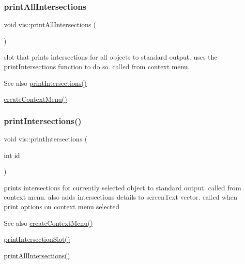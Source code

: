 \subsubsection{\texorpdfstring{print\+All\+Intersections}{printAllIntersections}}
{\footnotesize\ttfamily void vis\+::print\+All\+Intersections (\begin{DoxyParamCaption}{ }\end{DoxyParamCaption})\hspace{0.3cm}{\ttfamily [slot]}}

slot that prints intersections for all objects to standard output. uses the print\+Intersections function to do so. called from context menu.

\begin{DoxySeeAlso}{See also}
\mbox{\hyperlink{classvis_a9d087bde79e6856772dc3a1f6f89294e}{print\+Intersections()}} 

\mbox{\hyperlink{classvis_a63af66f730f0f06f36d255bcc7a7a244}{create\+Context\+Menu()}} 
\end{DoxySeeAlso}
\mbox{\label{classvis_a9d087bde79e6856772dc3a1f6f89294e}} 
\subsubsection{\texorpdfstring{print\+Intersections()}{printIntersections()}}
{\footnotesize\ttfamily void vis\+::print\+Intersections (\begin{DoxyParamCaption}\item[{int}]{id }\end{DoxyParamCaption})}

prints intersections for currently selected object to standard output. called from context menu. also adds intersections details to screen\+Text vector. called when print options on context menu selected ~\newline
 \begin{DoxySeeAlso}{See also}
\mbox{\hyperlink{classvis_a63af66f730f0f06f36d255bcc7a7a244}{create\+Context\+Menu()}} 

\mbox{\hyperlink{classvis_a192e67455047ca991fb29fbd4074c11d}{print\+Intersection\+Slot()}} 

\mbox{\hyperlink{classvis_af09e2926e8e8dfa0eca3d6b2f3946fdd}{print\+All\+Intersections()}} 
\end{DoxySeeAlso}

